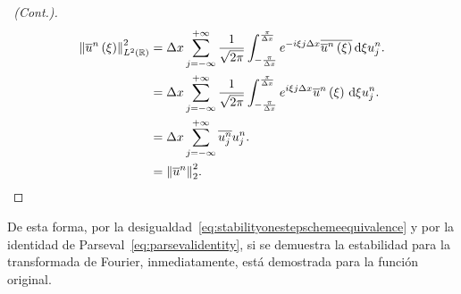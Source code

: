 \begin{frame}
    \frametitle{\secname}

    \begin{proof}[\proofname\ (Cont.)]
        \begin{align*}
            {\left\|
                \overline{u}^{n}
                \left(\xi\right)
                \right\|}^{2}_{L^{2}\left(\mathbb{R}\right)}
             & =
            \Delta x
            \sum_{j=-\infty}^{+\infty}
            \frac{1}{\sqrt{2\pi}}
            \int_{-\frac{\pi}{\Delta x}}^{\frac{\pi}{\Delta x}}
            e^{-i\xi j \Delta x}
            \overline{\overline{u}^{n}\left(\xi\right)}
            \dl\xi
            u^{n}_{j}. \\
             & =
            \Delta x
            \sum_{j=-\infty}^{+\infty}
            \frac{1}{\sqrt{2\pi}}
            \int_{-\frac{\pi}{\Delta x}}^{\frac{\pi}{\Delta x}}
            e^{i\xi j \Delta x}
            \overline{u}^{n}
            \left(\xi\right)
            \dl\xi
            u^{n}_{j}. \\
             & =
            \Delta x
            \sum_{j=-\infty}^{+\infty}
            \overline{u^{n}_{j}}
            u^{n}_{j}. \\
             & =
            {\left\|\overline{u}^{n}\right\|}^{2}_{2}.
            \tag*{\qedhere}
        \end{align*}
    \end{proof}
    De esta forma, por la
    desigualdad~\eqref{eq:stabilityonestepschemeequivalence} y por la
    identidad de Parseval~\eqref{eq:parsevalidentity}, si se demuestra la
    estabilidad para la transformada de Fourier, inmediatamente, está
    demostrada para la función original.
\end{frame}

